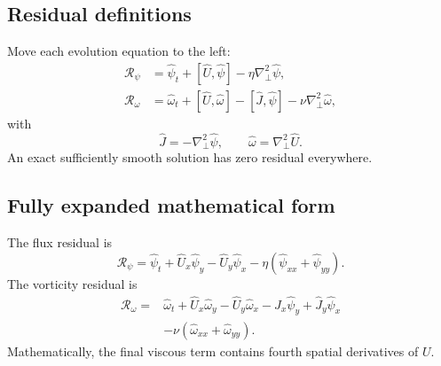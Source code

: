 \documentclass[11pt]{article}
\newcommand{\bracket}[2]{\left[#1,#2\right]}
\newcommand{\Lap}{\nabla_\perp^2}
\newcommand{\Rpsi}{\mathcal{R}_{\psi}}
\newcommand{\Romega}{\mathcal{R}_{\omega}}
\begin{document}
\subsection{Residual definitions}
Move each evolution equation to the left:
\begin{align}
\Rpsi
&=\widehat\psi_t+\bracket{\widehat U}{\widehat\psi}
-\eta\Lap\widehat\psi,
\label{eq:Rpsi}\qquad\\
\Romega
&=\widehat\omega_t+\bracket{\widehat U}{\widehat\omega}
-\bracket{\widehat J}{\widehat\psi}
-\nu\Lap\widehat\omega,
\label{eq:Romega}
\end{align}
with
\begin{equation}
\widehat J=-\Lap\widehat\psi,
\qquad
\widehat\omega=\Lap\widehat U.
\end{equation}
An exact sufficiently smooth solution has zero residual everywhere.

\subsection{Fully expanded mathematical form}
The flux residual is
\begin{equation}
\Rpsi=\widehat\psi_t
+\widehat U_x\widehat\psi_y
-\widehat U_y\widehat\psi_x
-\eta(\widehat\psi_{xx}+\widehat\psi_{yy}).
\end{equation}
The vorticity residual is
\begin{align}
\Romega={}&\widehat\omega_t
+\widehat U_x\widehat\omega_y
-\widehat U_y\widehat\omega_x
-\widehat J_x\widehat\psi_y
+\widehat J_y\widehat\psi_x\\
&-\nu(\widehat\omega_{xx}+\widehat\omega_{yy}).
\end{align}
Mathematically, the final viscous term contains fourth spatial derivatives of $U$.
\end{document}
